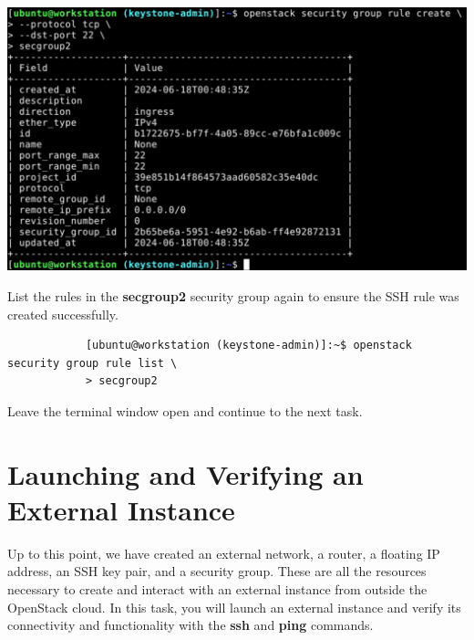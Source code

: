 \documentclass[letterpaper, 12pt]{article}
\begin{document}
\begin{enumerate}
\begin{labstep}
        \begin{center}
            \includegraphics[width=\linewidth]{images/part5/step16.png}
        \end{center}
    \end{labstep}

    \begin{labstep}
        List the rules in the \textbf{secgroup2} security group again to ensure the SSH rule was created successfully.
        \begin{lstlisting}
            [ubuntu@workstation (keystone-admin)]:~$ openstack security group rule list \
            > secgroup2
        \end{lstlisting}
    \end{labstep}

    \begin{labstep}
        Leave the terminal window open and continue to the next task.
    \end{labstep}

\end{enumerate}

\section{Launching and Verifying an External Instance}\label{sec:launching_an_external_isntance}
Up to this point, we have created an external network, a router, a floating IP address, an SSH key pair, and a security group.
These are all the resources necessary to create and interact with an external instance from outside the OpenStack cloud.
In this task, you will launch an external instance and verify its connectivity and functionality with the \textbf{ssh} and \textbf{ping} commands.
\end{document}
